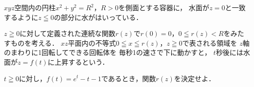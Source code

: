 \documentclass[../../main.tex]{subfiles}
\begin{document}
$xyz$空間内の円柱$x^2+y^2=R^2$，$R>0$を側面とする容器に，
水面が$z=0$と一致するように$z\leqq0$の部分に水がはいっている．

$z\geqq0$に対して定義された連続な関数$r(z)$で$r(0)=0$，$0\leqq r(z)<R$をみたすものを考える．
$xz$平面内の不等式$0 \leqq x \leqq r(z)$，$z\geqq0$で表される領域を
$z$軸のまわりに1回転してできる回転体を
毎秒1の速さで下に動かすと，
$t$秒後には水面が$z=f(t)$に上昇するという．

$t\geqq0$に対し，$f(t)=e^t-t-1$であるとき，関数$r(z)$を決定せよ．
\end{document}
